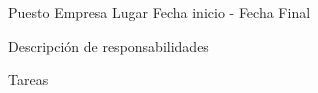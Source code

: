 
\begin{cventries}
  \cventry
    {Puesto} %
    {Empresa} %
    {Lugar} %
    {Fecha inicio - Fecha Final} %
    {
      \begin{cvitems} %
        \item {Descripción de responsabilidades}
        \item {Tareas}
      \end{cvitems}
    }

\end{cventries}
